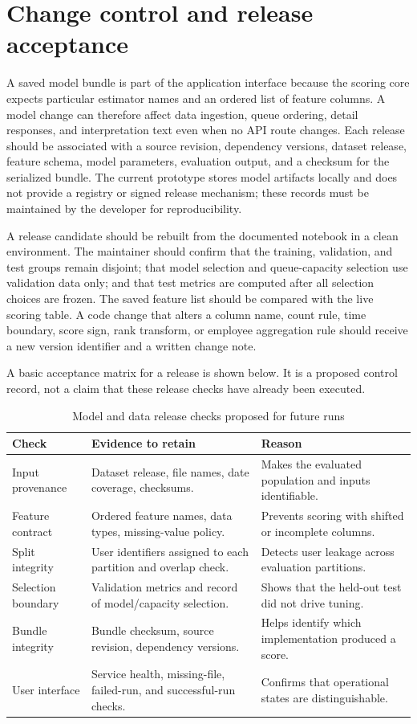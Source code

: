 \section{Change control and release acceptance}
A saved model bundle is part of the application interface because the
scoring core expects particular estimator names and an ordered list of
feature columns. A model change can therefore affect data ingestion,
queue ordering, detail responses, and interpretation text even when
no API route changes. Each release should be associated with a source
revision, dependency versions, dataset release, feature schema, model
parameters, evaluation output, and a checksum for the serialized
bundle. The current prototype stores model artifacts locally and does
not provide a registry or signed release mechanism; these records must
be maintained by the developer for reproducibility.

A release candidate should be rebuilt from the documented notebook in
a clean environment. The maintainer should confirm that the training,
validation, and test groups remain disjoint; that model selection and
queue-capacity selection use validation data only; and that test
metrics are computed after all selection choices are frozen. The saved
feature list should be compared with the live scoring table. A code
change that alters a column name, count rule, time boundary, score sign,
rank transform, or employee aggregation rule should receive a new
version identifier and a written change note.

A basic acceptance matrix for a release is shown below. It is a
proposed control record, not a claim that these release checks have
already been executed.
\begin{table}[H]
\centering
\tablefont
\caption{Model and data release checks proposed for future runs}
\label{tab:release-checks}
\begin{tabularx}{\textwidth}{|p{}|p{}|Y|}
\hline
\textbf{Check} & \textbf{Evidence to retain} & \textbf{Reason}\\
\hline
Input provenance & Dataset release, file names, date coverage, checksums. & Makes the evaluated population and inputs identifiable.\\
\hline
Feature contract & Ordered feature names, data types, missing-value policy. & Prevents scoring with shifted or incomplete columns.\\
\hline
Split integrity & User identifiers assigned to each partition and overlap check. & Detects user leakage across evaluation partitions.\\
\hline
Selection boundary & Validation metrics and record of model/capacity selection. & Shows that the held-out test did not drive tuning.\\
\hline
Bundle integrity & Bundle checksum, source revision, dependency versions. & Helps identify which implementation produced a score.\\
\hline
User interface & Service health, missing-file, failed-run, and successful-run checks. & Confirms that operational states are distinguishable.\\
\hline
\end{tabularx}
\end{table}

